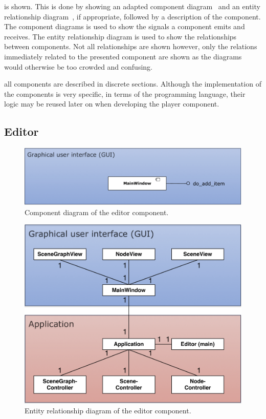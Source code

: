 \documentclass[%
    a4paper,    %
    justified,  %
    nobib,      %
    openany     %
]{tufte-book}
\begin{document}
 is shown. This is done by
showing an adapted component diagram~\cite[pp. 653 -- 654]{larman-applying-2004}
and an entity relationship diagram~\cite[pp. 501 ff.]{larman-applying-2004}, if
appropriate, followed by a description of the component. The component diagrams
is used to show the signals a component emits and receives. The entity
relationship diagram is used to show the relationships between components. Not
all relationships are shown however, only the relations immediately related to
the presented component are shown as the diagrams would otherwise be too crowded
and confusing.

 all components are described in discrete
sections. Although the implementation of the components is very specific, in
terms of the programming language, their logic may be reused later on when
developing the player component.

\subsection{Editor}
\label{results:subsec:program:editor}

\begin{figure}[ht]
  \caption{Component diagram of the editor component.}
  \label{fig:editor-component-diagram}
  \includegraphics[width=0.95\linewidth]{images/editor-component-diagram}
\end{figure}

\begin{figure}[ht]
  \caption{Entity relationship diagram of the editor component.}
  \label{fig:editor-erd}
  \includegraphics[width=0.75\linewidth]{images/editor-erd}
\end{figure}
\end{document}
